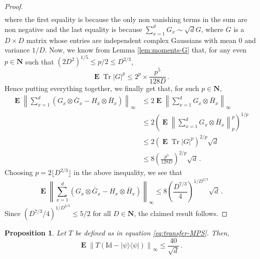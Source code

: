 \documentclass{amsart}
\newtheorem{proposition}[theorem]{Proposition}
\newcommand{\N}{\mathbf{N}}
\renewcommand{\leq}{\leqslant}
\newcommand{\Id}{\mathrm{Id}}
\DeclareMathOperator{\Tr}{Tr}
\DeclareMathOperator{\E}{\mathbf{E}}
\newcommand{\ketbra}[2]{| #1 \rangle\!\langle #2 |}
\begin{document}
\begin{proof}
\begin{align*}
    \end{align*}
    where the first equality is because the only non vanishing terms in the sum are non negative and the last equality is because $\sum_{x=1}^d G_x \sim \sqrt{d}G$, where $G$ is a $D\times D$ matrix whose entries are independent complex Gaussians with mean $0$ and variance $1/D$. Now, we know from Lemma \ref{lem:moments-G} that, for any even $p\in\N$ such that $(2D^2)^{1/5}\leq p/2 \leq D^{2/3}$,
    \[ \E \Tr|G|^p \leq 2^p\times\frac{p^5}{128D} \, . \]
    Hence putting everything together, we finally get that, for such $p\in\N$,
    \begin{align*}
        \E \left\| \sum_{x=1}^d \left( G_{x}\otimes\bar{G}_{x} - H_{x}\otimes\bar{H}_{x} \right) \right\|_{\infty} & \leq 2 \E \left\| \sum_{x=1}^d G_{x}\otimes\bar{H}_{x} \right\|_{\infty}               \\
                                                                                                                   & \leq 2\left(\E \left\| \sum_{x=1}^d G_{x}\otimes\bar{H}_{x} \right\|^p_p \right)^{1/p} \\
                                                                                                                   & \leq 2 (\E \Tr|G|^p)^{2/p}\sqrt{d}                                                     \\
                                                                                                                   & \leq 8 \left(\frac{p^5}{128D}\right)^{2/p} \sqrt{d} \, .
    \end{align*}
    Choosing $p=2\lfloor D^{2/3} \rfloor$ in the above inequality, we see that
    \[ \E \left\| \sum_{x=1}^d \left( G_{x}\otimes\bar{G}_{x} - H_{x}\otimes\bar{H}_{x} \right) \right\|_{\infty} \leq 8 \left(\frac{D^{7/3}}{4}\right)^{1/D^{2/3}} \sqrt{d} \, . \]
    Since $\left(D^{7/3}/4\right)^{1/D^{2/3}}\leq 5/2$ for all $D\in\N$, the claimed result follows.
\end{proof}

\begin{proposition} \label{prop:MPS-2}
    Let $T$ be defined as in equation \eqref{eq:transfer-MPS}. Then,
    \[ \E \left\|T(\Id-\ketbra{\psi}{\psi})\right\|_{\infty} \leq \frac{40}{\sqrt{d}} \, . \]
\end{proposition}
\end{document}
